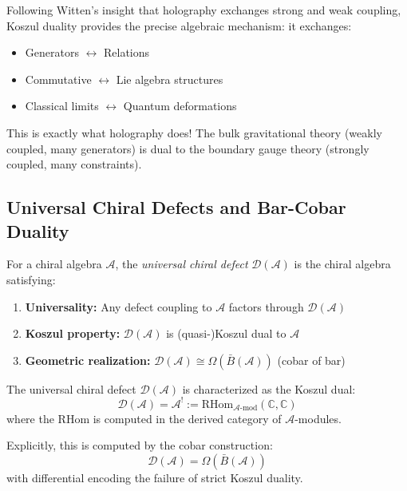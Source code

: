 \begin{remark}
Following Witten's insight that holography exchanges strong and weak coupling, Koszul duality provides the precise algebraic mechanism: it exchanges:
\begin{itemize}
\item Generators $\leftrightarrow$ Relations
\item Commutative $\leftrightarrow$ Lie algebra structures
\item Classical limits $\leftrightarrow$ Quantum deformations
\end{itemize}
This is exactly what holography does! The bulk gravitational theory (weakly coupled, many generators) is dual to the boundary gauge theory (strongly coupled, many constraints).
\end{remark}

\subsection{Universal Chiral Defects and Bar-Cobar Duality}

\begin{definition}\label{def:universal-defect}
For a chiral algebra $\mathcal{A}$, the \emph{universal chiral defect} $\mathcal{D}(\mathcal{A})$ is the chiral algebra satisfying:
\begin{enumerate}
\item \textbf{Universality:} Any defect coupling to $\mathcal{A}$ factors through $\mathcal{D}(\mathcal{A})$
\item \textbf{Koszul property:} $\mathcal{D}(\mathcal{A})$ is (quasi-)Koszul dual to $\mathcal{A}$
\item \textbf{Geometric realization:} $\mathcal{D}(\mathcal{A}) \cong \Omega(\bar{B}(\mathcal{A}))$ (cobar of bar)
\end{enumerate}
\end{definition}

\begin{theorem}[Universal Defect = Koszul Dual]\label{thm:defect-koszul}
The universal chiral defect $\mathcal{D}(\mathcal{A})$ is characterized as the Koszul dual:
$$\mathcal{D}(\mathcal{A}) = \mathcal{A}^! := \text{RHom}_{\mathcal{A}\text{-mod}}(\mathbb{C}, \mathbb{C})$$
where the RHom is computed in the derived category of $\mathcal{A}$-modules.

Explicitly, this is computed by the cobar construction:
$$\mathcal{D}(\mathcal{A}) = \Omega(\bar{B}(\mathcal{A}))$$
with differential encoding the failure of strict Koszul duality.
\end{theorem}

